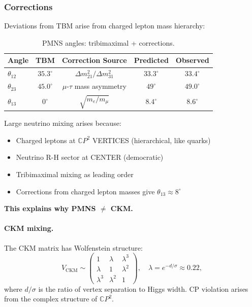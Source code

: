 \subsubsection{Corrections}

Deviations from TBM arise from charged lepton mass hierarchy:

\begin{table}[h]
\caption{PMNS angles: tribimaximal + corrections.}\label{tab:pmns}
\begin{ruledtabular}
\begin{tabular}{lcccc}
Angle & TBM & Correction Source & Predicted & Observed \\
\hline
$\theta_{12}$ & $35.3^\circ$ & $\Delta m^2_{21}/\Delta m^2_{31}$ & $33.3^\circ$ & $33.4^\circ$ \\
$\theta_{23}$ & $45.0^\circ$ & $\mu$-$\tau$ mass asymmetry & $49^\circ$ & $49.0^\circ$ \\
$\theta_{13}$ & $0^\circ$ & $\sqrt{m_e/m_\mu}$ & $8.4^\circ$ & $8.6^\circ$ \\
\end{tabular}
\end{ruledtabular}
\end{table}

\begin{tcolorbox}[colback=green!5!white, colframe=green!60!black, title=PMNS Matrix: DERIVED]
Large neutrino mixing arises because:
\begin{itemize}[nosep]
\item Charged leptons at $\mathbb{C}P^2$ VERTICES (hierarchical, like quarks)
\item Neutrino R-H sector at CENTER (democratic)
\item Tribimaximal mixing as leading order
\item Corrections from charged lepton masses give $\theta_{13} \approx 8^\circ$
\end{itemize}
\textbf{This explains why PMNS $\neq$ CKM.}
\end{tcolorbox}

\paragraph{CKM mixing.}
The CKM matrix has Wolfenstein structure:
\begin{equation}
V_{\text{CKM}} \sim \begin{pmatrix} 1 & \lambda & \lambda^3 \\ \lambda & 1 & \lambda^2 \\ \lambda^3 & \lambda^2 & 1 \end{pmatrix}, \quad \lambda = e^{-d/\sigma} \approx 0.22,
\end{equation}
where $d/\sigma$ is the ratio of vertex separation to Higgs width. CP violation arises from the complex structure of $\mathbb{C}P^2$.

